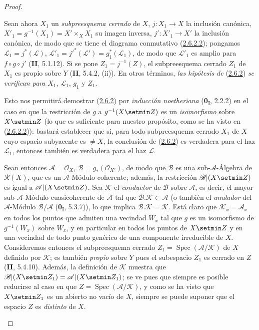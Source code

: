 \begin{proof}
\begin{env}[2.6.2.3]
\label{III.2.6.2.3-fr}
Sean ahora $X_1$ un \emph{subpreesquema cerrado} de $X$,
$j:X_1\to X$ la inclusión canónica,
$X'_1=g^{-1}(X_1)=X'\times_X X_1$ su imagen inversa,
$j':X'_1\to X'$ la inclusión canónica, de modo que se tiene el diagrama
conmutativo (\hyperref[III.2.6.2.2-fr]{2.6.2.2}); pongamos
$\mathcal L_1=j^*(\mathcal L)$,
$\mathcal L'_1=j'^*(\mathcal L')=g_1^*(\mathcal L_1)$, de modo que
$\mathcal L'_1$ es amplio para $f\circ g\circ j'$ (\textbf{II}, 5.1.12). Si se
pone $Z_1=j^{-1}(Z)$, el subpreesquema cerrado $Z_1$ de $X_1$ es propio
sobre $Y$ (\textbf{II}, 5.4.2, (ii)). En otros términos, \emph{las hipótesis de}
(\hyperref[III.2.6.2-fr]{2.6.2}) \emph{se verifican para} $X_1$,
$\mathcal L_1$, $g_1$ y $Z_1$.
\end{env}

Esto nos permitirá demostrar
(\hyperref[III.2.6.2-fr]{2.6.2}) por \emph{inducción noetheriana}
(\textbf{0}\textsubscript{I}, 2.2.2) en el caso en que la restricción de $g$ a
$g^{-1}(X\setmin Z)$ es un \emph{isomorfismo} sobre $X\setmin Z$ (lo que es suficiente para
nuestro propósito, como se ha visto en
(\hyperref[III.2.6.2.2-fr]{2.6.2.2})): bastará establecer que si, para
todo subpreesquema cerrado $X_1$ de $X$ cuyo espacio subyacente es
$\neq X$, la conclusión de (\hyperref[III.2.6.2-fr]{2.6.2}) es verdadera
para el haz $\mathcal L_1$, entonces también es verdadera para el
haz $\mathcal L$.

\begin{env}[2.6.2.4]
\label{III.2.6.2.4-fr}
Sean entonces $\mathcal A=\mathcal O_X$, $\mathcal B=g_*(\mathcal O_{X'})$,
de modo que $\mathcal B$ es una sub-$\mathcal A$-Álgebra de
$\mathcal R(X)$, que es un $\mathcal A$-Módulo coherente; además, la
restricción $\mathcal B|(X\setmin Z)$ es igual a $\mathcal A|(X\setmin Z)$. Sea
$\mathcal K$ el \emph{conductor} de $\mathcal B$ sobre $\mathcal A$, es decir,
el mayor sub-$\mathcal A$-Módulo cuasicoherente de $\mathcal A$ tal
que $\mathcal B.\mathcal K\subset\mathcal A$ (o también el \emph{anulador} del
$\mathcal A$-Módulo $\mathcal B/\mathcal A$
(\textbf{0}\textsubscript{I}, 5.3.7)), lo que implica
$\mathcal B.\mathcal K=\mathcal K$. Está claro que
$\mathcal K_x=\mathcal A_x$ en todos los puntos que admiten una vecindad
$W_x$ tal que $g$ es un isomorfismo de $g^{-1}(W_x)$ sobre $W_x$, y en
particular en todos los puntos de $X\setmin Z$ y en una vecindad de todo
punto genérico de una componente irreducible de $X$. Consideremos entonces
el subpreesquema cerrado $Z_1=\operatorname{Spec}(\mathcal A/\mathcal K)$
de $X$ definido por $\mathcal K$; es también \emph{propio} sobre $Y$ pues el
subespacio $Z_1$ es cerrado en $Z$ (\textbf{II}, 5.4.10). Además, la definición
de $\mathcal K$ muestra que
$\mathcal B|(X\setmin Z_1)=\mathcal A|(X\setmin Z_1)$; se ve pues que siempre es posible
reducirse al caso en que
$Z=\operatorname{Spec}(\mathcal A/\mathcal K)$, y como se ha visto que
$X\setmin Z_1$ es un abierto no vacío de $X$, siempre se puede suponer que
el espacio $Z$ es \emph{distinto} de $X$.
\end{env}


\end{proof}
